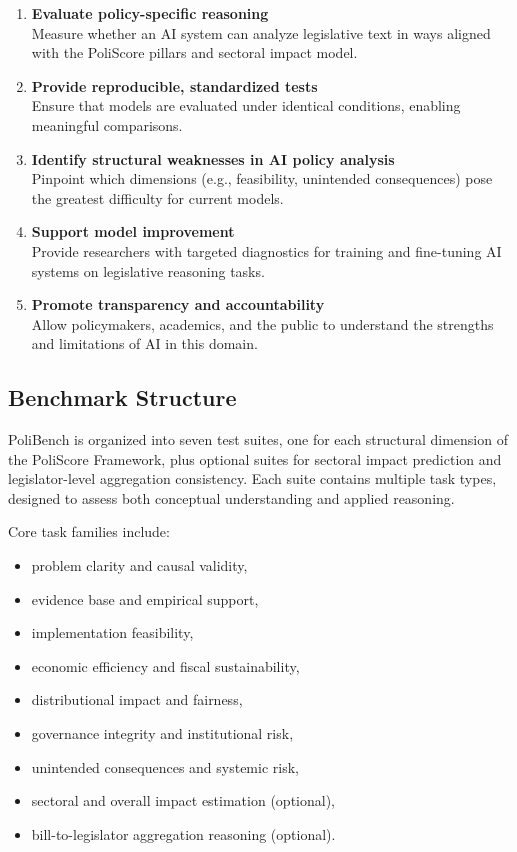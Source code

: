 \documentclass[12pt]{article}
\begin{document}
\begin{enumerate}[label=(\arabic*)]
    \item \textbf{Evaluate policy-specific reasoning}\\
    Measure whether an AI system can analyze legislative text in ways aligned with the PoliScore pillars and sectoral
    impact model.

    \item \textbf{Provide reproducible, standardized tests}\\
    Ensure that models are evaluated under identical conditions, enabling meaningful comparisons.

    \item \textbf{Identify structural weaknesses in AI policy analysis}\\
    Pinpoint which dimensions (e.g., feasibility, unintended consequences) pose the greatest difficulty for current
    models.

    \item \textbf{Support model improvement}\\
    Provide researchers with targeted diagnostics for training and fine-tuning AI systems on legislative reasoning tasks.

    \item \textbf{Promote transparency and accountability}\\
    Allow policymakers, academics, and the public to understand the strengths and limitations of AI in this domain.
\end{enumerate}

\subsection{Benchmark Structure}

PoliBench is organized into seven test suites, one for each structural dimension of the PoliScore Framework, plus optional
suites for sectoral impact prediction and legislator-level aggregation consistency. Each suite contains multiple task
types, designed to assess both conceptual understanding and applied reasoning.

Core task families include:

\begin{itemize}
    \item problem clarity and causal validity,
    \item evidence base and empirical support,
    \item implementation feasibility,
    \item economic efficiency and fiscal sustainability,
    \item distributional impact and fairness,
    \item governance integrity and institutional risk,
    \item unintended consequences and systemic risk,
    \item sectoral and overall impact estimation (optional),
    \item bill-to-legislator aggregation reasoning (optional).
\end{itemize}
\end{document}
